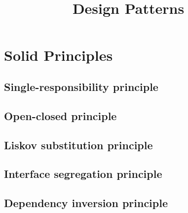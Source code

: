 \documentclass[12pt]{article}
\title{Design Patterns}
\author{}
\begin{document}
\maketitle

\section{Solid Principles}
\subsection{Single-responsibility principle}
\subsection{Open-closed principle}
\subsection{Liskov substitution principle}
\subsection{Interface segregation principle}
\subsection{Dependency inversion principle}

\inputminted[bgcolor=background, breaklines]{typescript}{../src/index.ts}
\end{document}
